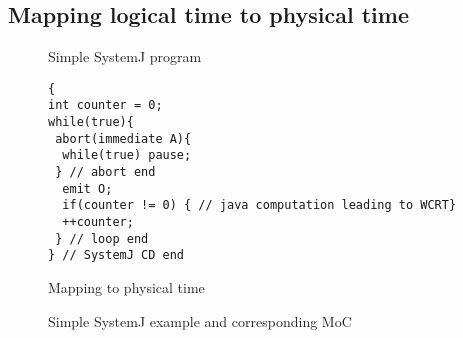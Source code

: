 \subsection{Mapping logical time to physical time}
\label{sec:mapping-logical-time}

\begin{figure}[t!]
\begin{SubFloat}{\label{fig:2a}Simple SystemJ program}%
\begin{minipage}[b]{0.3\linewidth}%
  \begin{scriptsize}
\begin{verbatim}
{
int counter = 0;
while(true){
 abort(immediate A){
  while(true) pause; 
 } // abort end
  emit O;
  if(counter != 0) { // java computation leading to WCRT}
  ++counter;
 } // loop end
} // SystemJ CD end
\end{verbatim}%
  \end{scriptsize}
\end{minipage}%
\end{SubFloat}
\hspace{1.5cm}%

\begin{SubFloat}{\label{fig:2c}Mapping to physical time}%
\scalebox{0.68}{}
\end{SubFloat}%
\caption{Simple SystemJ example and corresponding MoC}
\label{fig:2}
\end{figure}

